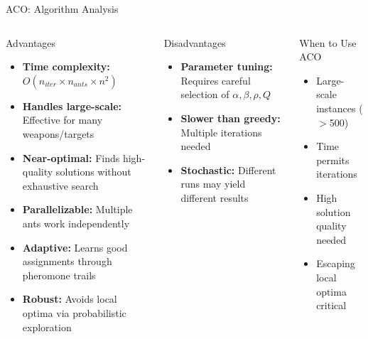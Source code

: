 \documentclass[aspectratio=43,8pt]{beamer}
\begin{document}
\begin{frame}{ACO: Algorithm Analysis}
\begin{columns}[t]
\begin{block}{Advantages}
\begin{itemize}
    \item \textbf{Time complexity:} $O(n_{iter} \times n_{ants} \times n^2)$
    \item \textbf{Handles large-scale:} Effective for many weapons/targets
    \item \textbf{Near-optimal:} Finds high-quality solutions without exhaustive search
    \item \textbf{Parallelizable:} Multiple ants work independently
    \item \textbf{Adaptive:} Learns good assignments through pheromone trails
    \item \textbf{Robust:} Avoids local optima via probabilistic exploration
\end{itemize}
\end{block}

\begin{alertblock}{Disadvantages}
\begin{itemize}
    \item \textbf{Parameter tuning:} Requires careful selection of $\alpha, \beta, \rho, Q$
    \item \textbf{Slower than greedy:} Multiple iterations needed
    \item \textbf{Stochastic:} Different runs may yield different results
\end{itemize}
\end{alertblock}

\begin{exampleblock}{When to Use ACO}
\begin{itemize}
    \item Large-scale instances ($>$500)
    \item Time permits iterations
    \item High solution quality needed
    \item Escaping local optima critical
\end{itemize}
\end{exampleblock}
\end{columns}
\end{frame}

\end{document}
